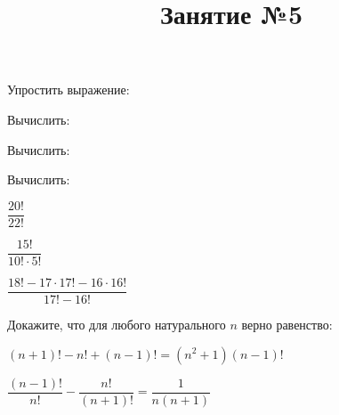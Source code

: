 \begin{listofex}
	\item Упростить выражение:
	\begin{enumcols}[itemcolumns=2]
		\item {}
		\item {}
		\item {}
	\end{enumcols}
	\item Вычислить:
	\begin{enumcols}[itemcolumns=2]
		\item {}
		\item {}
		\item {}
		\item {}
	\end{enumcols}
	\item Вычислить:
	\begin{enumcols}[itemcolumns=2]
		\item {}
		\item {}
	\end{enumcols}
	\item Вычислить:
	\begin{enumcols}[itemcolumns=3]
		\item \( \dfrac{20!}{22!} \) 
		\item \( \dfrac{15!}{10!\cdot5!} \) 
		\item \( \dfrac{18!-17\cdot17!-16\cdot16!}{17!-16!} \) 
	\end{enumcols}
	\item Докажите, что для любого натурального \( n \) верно равенство:
	\begin{enumcols}[itemcolumns=2]
		\item \( (n+1)!-n!+(n-1)! = (n^2+1)(n-1)! \)
		\item \( \dfrac{(n-1)!}{n!}-\dfrac{n!}{(n+1)!}=\dfrac{1}{n(n+1)} \)
	\end{enumcols}
	\item {}
\end{listofex}
\newpage
\title{Занятие №5}
